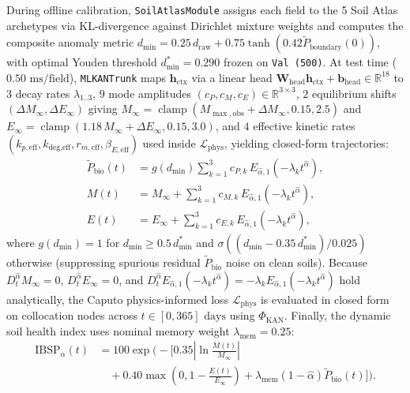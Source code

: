 \documentclass[10pt,twocolumn,a4paper]{article}
\begin{document}
During offline calibration, \texttt{SoilAtlasModule} assigns each field to the 5 Soil Atlas archetypes via KL-divergence against Dirichlet mixture weights and computes the composite anomaly metric $d_{\min} = 0.25\,d_{\text{raw}} + 0.75\tanh(0.42\tilde{P}_{\text{boundary}}(0))$, with optimal Youden threshold $d_{\min}^* = 0.290$ frozen on \texttt{Val (500)}. At test time ($0.50\text{ ms/field}$), \texttt{MLKANTrunk} maps $\mathbf{h}_{\text{ctx}}$ via a linear head $\mathbf{W}_{\text{head}}\mathbf{h}_{\text{ctx}} + \mathbf{b}_{\text{head}} \in \mathbb{R}^{18}$ to $3$ decay rates $\lambda_{1..3}$, $9$ mode amplitudes $(c_P, c_M, c_E) \in \mathbb{R}^{3\times 3}$, $2$ equilibrium shifts $(\Delta M_\infty, \Delta E_\infty)$ giving $M_\infty = \operatorname{clamp}(M_{\max,\text{obs}} + \Delta M_\infty, 0.15, 2.5)$ and $E_\infty = \operatorname{clamp}(1.18\,M_\infty + \Delta E_\infty, 0.15, 3.0)$, and $4$ effective kinetic rates $(k_{p,\text{eff}}, k_{\text{deg,eff}}, r_{m,\text{eff}}, \beta_{E,\text{eff}})$ used inside $\mathcal{L}_{\text{phys}}$, yielding closed-form trajectories:
\begin{align}
  \tilde{P}_{\text{bio}}(t) &= g(d_{\min})\sum_{k=1}^3 c_{P,k}\,E_{\hat{\alpha},1}\!\left(-\lambda_k t^{\hat{\alpha}}\right), \label{eq:p_exp} \\
  M(t) &= M_\infty + \sum_{k=1}^3 c_{M,k}\,E_{\hat{\alpha},1}\!\left(-\lambda_k t^{\hat{\alpha}}\right), \label{eq:m_exp} \\
  E(t) &= E_\infty + \sum_{k=1}^3 c_{E,k}\,E_{\hat{\alpha},1}\!\left(-\lambda_k t^{\hat{\alpha}}\right), \label{eq:e_exp}
\end{align}
where $g(d_{\min}) = 1$ for $d_{\min} \ge 0.5\,d_{\min}^*$ and $\sigma((d_{\min} - 0.35\,d_{\min}^*)/0.025)$ otherwise (suppressing spurious residual $\tilde{P}_{\text{bio}}$ noise on clean soils). Because $D_t^{\hat{\alpha}} M_\infty = 0$, $D_t^{\hat{\alpha}} E_\infty = 0$, and $D_t^{\hat{\alpha}} E_{\hat{\alpha},1}(-\lambda_k t^{\hat{\alpha}}) = -\lambda_k E_{\hat{\alpha},1}(-\lambda_k t^{\hat{\alpha}})$ hold analytically, the Caputo physics-informed loss $\mathcal{L}_{\text{phys}}$ is evaluated in closed form on collocation nodes across $t \in [0, 365]\text{ days}$ using $\Phi_{\text{KAN}}$. Finally, the dynamic soil health index uses nominal memory weight $\lambda_{\text{mem}} = 0.25$:
\begin{equation}
  \begin{aligned}
    \text{IBSP}_\alpha(t) &= 100\exp\!\Biggl(-\biggl[0.35\left|\ln\frac{M(t)}{M_\infty}\right| \\
    &\quad + 0.40\max\!\left(0, 1 - \frac{E(t)}{E_\infty}\right) + \lambda_{\text{mem}}(1-\hat{\alpha})\tilde{P}_{\text{bio}}(t)\biggr]\Biggr).
  \end{aligned} \label{eq:ibsp}
\end{equation}
\end{document}
